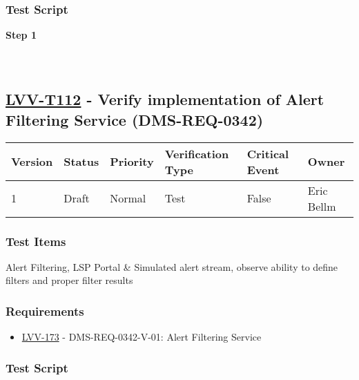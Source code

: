 \hypertarget{test-script-88}{%
\subsubsection{Test Script}\label{test-script-88}}

\textbf{Step 1}\\
~\\
~\\

\hypertarget{lvv-t112---verify-implementation-of-alert-filtering-service-dms-req-0342}{%
\subsection{\texorpdfstring{\href{https://jira.lsstcorp.org/secure/Tests.jspa\#/testCase/LVV-T112}{LVV-T112}
- Verify implementation of Alert Filtering Service
(DMS-REQ-0342)}{LVV-T112 - Verify implementation of Alert Filtering Service (DMS-REQ-0342)}}\label{lvv-t112---verify-implementation-of-alert-filtering-service-dms-req-0342}}

\begin{longtable}[]{@{}llllll@{}}
\toprule
Version & Status & Priority & Verification Type & Critical Event &
Owner\tabularnewline
\midrule
\endhead
1 & Draft & Normal & Test & False & Eric Bellm\tabularnewline
\bottomrule
\end{longtable}

\hypertarget{test-items-88}{%
\subsubsection{Test Items}\label{test-items-88}}

Alert Filtering, LSP Portal \& Simulated alert stream, observe ability
to define filters and proper filter results

\hypertarget{requirements-89}{%
\subsubsection{Requirements}\label{requirements-89}}

\begin{itemize}
\tightlist
\item
  \href{https://jira.lsstcorp.org/browse/LVV-173}{LVV-173} -
  DMS-REQ-0342-V-01: Alert Filtering Service
\end{itemize}

\hypertarget{test-script-89}{%
\subsubsection{Test Script}\label{test-script-89}}

